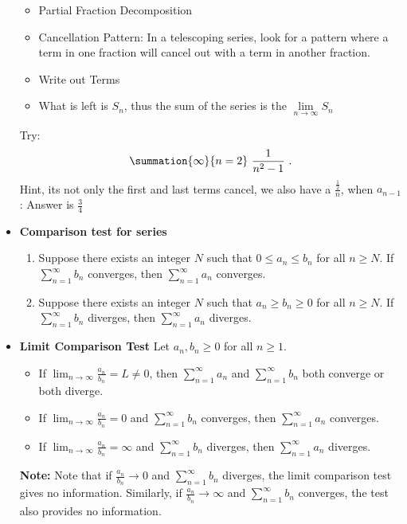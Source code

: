 \documentclass{report}
\begin{document}
\begin{itemize}
        \begin{itemize}
            \item Partial Fraction Decomposition
            \item Cancellation Pattern: In a telescoping series, look for a pattern where a term in one fraction will cancel out with a term in another fraction.
            \item Write out Terms
            \item What is left is $S_{n}$, thus the sum of the series is the $\lim\limits_{n \to \infty}{S_{n}} $
        \end{itemize}
        Try: 
        \begin{align*}
            \summation{\infty}{n=2}\ \frac{1}{n^{2}-1}\ 
        .\end{align*}
        Hint, its not only the first and last terms cancel, we also have a $\frac{\frac{1}{2}}{n}$, when $a_{n-1}$: Answer is $\frac{3}{4}$
    \item \textbf{Comparison test for series}
        \begin{enumerate}
            \item Suppose there exists an integer \( N \) such that \( 0 \leq a_n \leq b_n \) for all \( n \geq N \). If \( \sum_{n=1}^{\infty} b_n \) converges, then \( \sum_{n=1}^{\infty} a_n \) converges. 
            \item  Suppose there exists an integer \( N \) such that \( a_n \geq b_n \geq 0 \) for all \( n \geq N \). If \( \sum_{n=1}^{\infty} b_n \) diverges, then \( \sum_{n=1}^{\infty} a_n \) diverges.
        \end{enumerate}
    \item \textbf{Limit Comparison Test}
         Let \( a_n, b_n \geq 0 \) for all \( n \geq 1 \).
        \begin{itemize}
          \item If \( \lim_{n \to \infty} \frac{a_n}{b_n} = L \neq 0 \), then \( \sum_{n=1}^{\infty} a_n \) and \( \sum_{n=1}^{\infty} b_n \) both converge or both diverge.
          \item If \( \lim_{n \to \infty} \frac{a_n}{b_n} = 0 \) and \( \sum_{n=1}^{\infty} b_n \) converges, then \( \sum_{n=1}^{\infty} a_n \) converges.
          \item If \( \lim_{n \to \infty} \frac{a_n}{b_n} = \infty \) and \( \sum_{n=1}^{\infty} b_n \) diverges, then \( \sum_{n=1}^{\infty} a_n \) diverges.
        \end{itemize}
    \textbf{Note:} Note that if $\frac{a_n}{b_n} \to 0$ and $\sum_{n=1}^{\infty} b_n$ diverges, the limit comparison test gives no information. Similarly, if $\frac{a_n}{b_n} \to \infty$ and $\sum_{n=1}^{\infty} b_n$ converges, the test also provides no information. 




\end{itemize}
\end{document}
